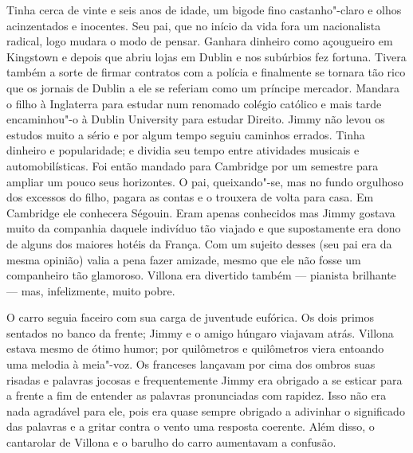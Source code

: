 Tinha cerca de vinte e seis anos de idade, um bigode fino castanho"-claro e
olhos acinzentados e inocentes.  Seu pai, que no início da vida fora um
nacionalista radical, logo mudara o modo de pensar.  Ganhara dinheiro como
açougueiro em Kingstown e depois que abriu lojas em Dublin e nos subúrbios fez
fortuna.  Tivera também a sorte de firmar contratos com a polícia e finalmente
se tornara tão rico que os jornais de Dublin a ele se referiam como um príncipe
mercador.  Mandara o filho à Inglaterra para estudar num renomado colégio
católico e mais tarde encaminhou"-o à Dublin University para estudar Direito.
Jimmy não levou os estudos muito a sério e por algum tempo seguiu caminhos
errados.  Tinha dinheiro e popularidade; e dividia seu tempo entre atividades
musicais e automobilísticas.  Foi então mandado para Cambridge por um semestre
para ampliar um pouco seus horizontes.  O pai, queixando"-se, mas no fundo
orgulhoso dos excessos do filho, pagara as contas e o trouxera de volta para
casa.  Em Cambridge ele conhecera Ségouin.  Eram apenas conhecidos mas Jimmy
gostava muito da companhia daquele indivíduo tão viajado e que supostamente era
dono de alguns dos maiores hotéis da França.  Com um sujeito desses (seu pai
era da mesma opinião) valia a pena fazer amizade, mesmo que ele não fosse um
companheiro tão glamoroso.  Villona era divertido também --- pianista brilhante
--- mas, infelizmente, muito pobre.

O carro seguia faceiro com sua carga de juventude eufórica.  Os dois primos
sentados no banco da frente; Jimmy e o amigo húngaro viajavam atrás.  Villona
estava mesmo de ótimo humor; por quilômetros e quilômetros viera entoando uma
melodia à meia"-voz.  Os franceses lançavam por cima dos ombros suas risadas e
palavras jocosas e frequentemente Jimmy era obrigado a se esticar para a frente
a fim de entender as palavras pronunciadas com rapidez.  Isso não era nada
agradável para ele, pois era quase sempre obrigado a adivinhar o significado
das palavras e a gritar contra o vento uma resposta coerente.  Além disso, o
cantarolar de Villona e o barulho do carro aumentavam a confusão.


